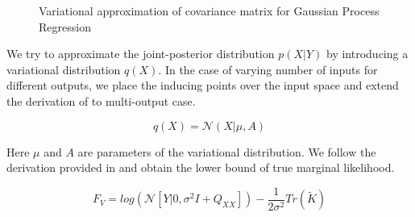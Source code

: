 \begin{figure}[!t]
  \centering
  \quad
  \caption{Variational approximation of covariance matrix for Gaussian Process Regression}
\end{figure}


We try to approximate the joint-posterior distribution \(p(X| Y)\) by introducing a variational distribution \(q(X)\). In the case of varying number of inputs for different outputs, we place the inducing points over the input space and extend the derivation of \cite{Titsias09variationallearning} to multi-output case. 

\begin{equation}\label{eq:multiVariationalQ}
 q(X) = \mathcal{N}(X|  \mu, A)
\end{equation}
 
Here \(\mu\) and \(A\) are parameters of the variational distribution. We follow the derivation provided in \cite{Titsias09variationallearning} and obtain the lower bound of true marginal likelihood.

\begin{equation}\label{eq:lowerBoundMultiVarNLML}
F_{V} = log(\mathcal{N}[Y| 0, \sigma ^{2}I + Q_{XX}]) - \frac{1}{2\sigma ^{2}}Tr(\tilde{K})
\end{equation}

